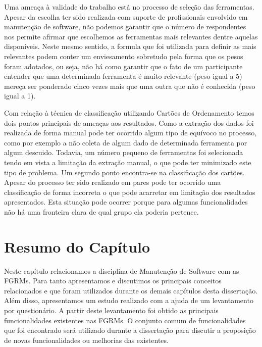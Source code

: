 Uma ameaça à validade do trabalho está no processo de seleção das ferramentas.
Apesar da escolha ter sido realizada com suporte de profissionais envolvido em
manutenção de software, não podemos garantir que o número de respondentes nos
permite afirmar que escolhemos as ferramentas mais relevantes dentre aquelas
disponíveis. Neste mesmo sentido, a formula que foi utilizada para definir as
mais relevantes podem conter um enviesamento sobretudo pela forma que os pesos
foram adotados, ou seja, não há como garantir que o fato de um participante
entender que uma determinada ferramenta é muito relevante (peso igual a 5)
mereça ser ponderado cinco vezes mais que uma outra que não é conhecida (peso
igual a 1).

Com relação à técnica de classificação utilizando Cartões de Ordenamento temos
dois pontos principais de ameaças aos resultados. Como a extração dos dados foi
realizada de forma manual pode ter ocorrido algum tipo de equívoco no processo,
como por exemplo a não coleta de algum dado de determinada ferramenta por algum
descuido. Todavia, um número pequeno de ferramentas foi selecionada tendo em
vista a limitação da extração manual, o que pode ter minimizado este tipo de
problema. Um segundo ponto encontra-se na classificação dos cartões. Apesar do
processo ter sido realizado em pares pode ter ocorrido uma classificação de
forma incorreta o que pode acarretar em limitação dos resultados apresentados.
Esta situação pode ocorrer porque para algumas funcionalidades não há uma
fronteira clara de qual grupo ela poderia pertence.

\section{Resumo do Capítulo}
\label{sec:resumo_do_capitulo}

Neste capítulo relacionamos a disciplina de Manutenção de Software com as FGRMs.
Para tanto apresentamos e discutimos os principais conceitos relacionados e que
foram utilizados durante os demais capítulos desta dissertação. Além disso,
apresentamos um estudo realizado com a ajuda de um levantamento por
questionário. A partir deste levantamento foi obtido as principais
funcionalidades existentes nas FGRMs. O conjunto comum de funcionalidades que
foi encontrado será utilizado durante a dissertação para discutir a proposição
de novas funcionalidades ou melhorias das existentes.
